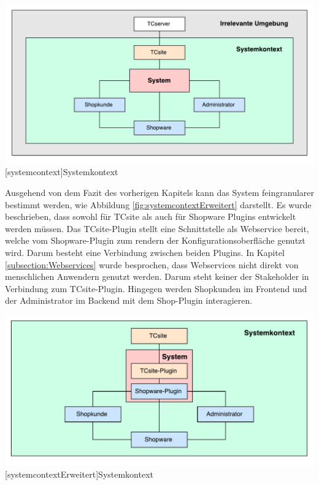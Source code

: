 \documentclass[12pt,a4paper,bibliography=totocnumbered,listof=totoc]{scrartcl}
\begin{document}
\vspace{1em}
\begin{minipage}{\linewidth}
	\centering
	\includegraphics[width=0.8\linewidth]{Abbildungen/systemcontext.pdf}
	[systemcontext]{Systemkontext}
	\label{fig:systemcontext}
\end{minipage}
\vspace{1em}

Ausgehend von dem Fazit des vorherigen Kapitels kann das System feingranularer bestimmt werden, wie Abbildung \ref{fig:systemcontextErweitert} darstellt. Es wurde beschrieben, dass sowohl für TCsite als auch für Shopware Plugins entwickelt werden müssen. Das TCsite-Plugin stellt eine Schnittstelle als Webservice bereit, welche vom Shopware-Plugin zum rendern der Konfigurationsoberfläche genutzt wird. Darum besteht eine Verbindung zwischen beiden Plugins.
In Kapitel \ref{subsection:Webservices} wurde besprochen, dass Webservices nicht direkt von menschlichen Anwendern genutzt werden. Darum steht keiner der Stakeholder in Verbindung zum TCsite-Plugin. Hingegen werden Shopkunden im Frontend und der Administrator im Backend mit dem Shop-Plugin interagieren.

\vspace{1em}
\begin{minipage}{\linewidth}
	\centering
	\includegraphics[width=0.8\linewidth]{Abbildungen/systemcontextErweitert.pdf}
	[systemcontextErweitert]{Systemkontext}
	\label{fig:systemcontextErweitert}
\end{minipage}
\vspace{1em}
\end{document}
